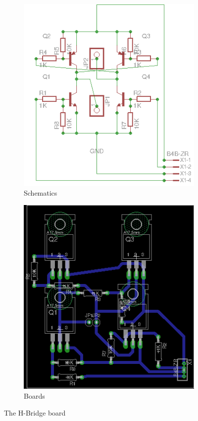 \begin{figure}[!ht]
	\begin{subfigure}{.49\textwidth}
		\centering
		\includegraphics[width=1\textwidth]{figures/H-bridge_schematics}
		\caption{Schematics}
		\label{fig:1-bridgeSCH}
	\end{subfigure}
	\begin{subfigure}{.49\textwidth}
		\centering
		\includegraphics[width=1\textwidth]{figures/H-bridge_board}
		\caption{Boards}
		\label{fig:1-bridgeBRD}
	\end{subfigure}
\caption{The H-Bridge board}
\label{fig:bridge}
\end{figure}


